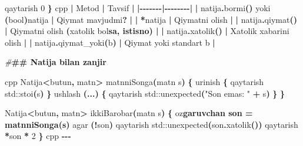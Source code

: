 \documentclass[a4paper,11pt,twoside,openright]{book}
\newenvironment{Shaded}{\begin{snugshade}}{\end{snugshade}}
\newcommand{\BuiltInTok}[1]{#1}
\newcommand{\CharTok}[1]{\textcolor[rgb]{0.31,0.60,0.02}{#1}}
\newcommand{\DataTypeTok}[1]{\textcolor[rgb]{0.13,0.29,0.53}{#1}}
\newcommand{\DecValTok}[1]{\textcolor[rgb]{0.00,0.00,0.81}{#1}}
\newcommand{\ErrorTok}[1]{\textcolor[rgb]{0.64,0.00,0.00}{\textbf{#1}}}
\newcommand{\NormalTok}[1]{#1}
\newcommand{\OperatorTok}[1]{\textcolor[rgb]{0.81,0.36,0.00}{\textbf{#1}}}
\newcommand{\PreprocessorTok}[1]{\textcolor[rgb]{0.56,0.35,0.01}{\textit{#1}}}
\newcommand{\StringTok}[1]{\textcolor[rgb]{0.31,0.60,0.02}{#1}}
\begin{document}
\begin{Shaded}
\begin{Highlighting}[]
\NormalTok{    qaytarish }\DecValTok{0}
\OperatorTok{\}}
\ErrorTok{\textasciigrave{}\textasciigrave{}\textasciigrave{}}\NormalTok{cpp}
\OperatorTok{|}\NormalTok{ Metod }\OperatorTok{|}\NormalTok{ Tavsif }\OperatorTok{|}
\OperatorTok{|{-}{-}{-}{-}{-}{-}{-}|{-}{-}{-}{-}{-}{-}{-}{-}|}
\OperatorTok{|} \ErrorTok{\textasciigrave{}}\NormalTok{natija}\OperatorTok{.}\NormalTok{bormi}\OperatorTok{()}\ErrorTok{\textasciigrave{}}\NormalTok{ yoki }\ErrorTok{\textasciigrave{}}\OperatorTok{(}\DataTypeTok{bool}\OperatorTok{)}\NormalTok{natija}\ErrorTok{\textasciigrave{}} \OperatorTok{|}\NormalTok{ Qiymat mavjudmi}\OperatorTok{?} \OperatorTok{|}
\OperatorTok{|} \ErrorTok{\textasciigrave{}}\OperatorTok{*}\NormalTok{natija}\ErrorTok{\textasciigrave{}} \OperatorTok{|}\NormalTok{ Qiymatni olish }\OperatorTok{|}
\OperatorTok{|} \ErrorTok{\textasciigrave{}}\NormalTok{natija}\OperatorTok{.}\NormalTok{qiymat}\OperatorTok{()}\ErrorTok{\textasciigrave{}} \OperatorTok{|}\NormalTok{ Qiymatni olish }\OperatorTok{(}\NormalTok{xatolik bo}\CharTok{\textquotesingle{}l}\ErrorTok{sa, istisno) |}
\OperatorTok{|} \ErrorTok{\textasciigrave{}}\NormalTok{natija}\OperatorTok{.}\NormalTok{xatolik}\OperatorTok{()}\ErrorTok{\textasciigrave{}} \OperatorTok{|}\NormalTok{ Xatolik xabarini olish }\OperatorTok{|}
\OperatorTok{|} \ErrorTok{\textasciigrave{}}\NormalTok{natija}\OperatorTok{.}\NormalTok{qiymat\_yoki}\OperatorTok{(}\NormalTok{b}\OperatorTok{)}\ErrorTok{\textasciigrave{}} \OperatorTok{|}\NormalTok{ Qiymat yoki standart }\ErrorTok{\textasciigrave{}}\NormalTok{b}\ErrorTok{\textasciigrave{}} \OperatorTok{|}

\PreprocessorTok{\#}\ErrorTok{\#\# \textasciigrave{}Natija\textasciigrave{} bilan zanjir}

\ErrorTok{\textasciigrave{}\textasciigrave{}\textasciigrave{}}\NormalTok{cpp}
\NormalTok{Natija}\OperatorTok{\textless{}}\NormalTok{butun}\OperatorTok{,}\NormalTok{ matn}\OperatorTok{\textgreater{}}\NormalTok{ matnniSonga}\OperatorTok{(}\NormalTok{matn s}\OperatorTok{)} \OperatorTok{\{}
\NormalTok{    urinish }\OperatorTok{\{}
\NormalTok{        qaytarish }\BuiltInTok{std::}\NormalTok{stoi}\OperatorTok{(}\NormalTok{s}\OperatorTok{)}
    \OperatorTok{\}}\NormalTok{ ushlash }\OperatorTok{(...)} \OperatorTok{\{}
\NormalTok{        qaytarish }\BuiltInTok{std::}\NormalTok{unexpected}\OperatorTok{(}\StringTok{"Son emas: "} \OperatorTok{+}\NormalTok{ s}\OperatorTok{)}
    \OperatorTok{\}}
\OperatorTok{\}}

\NormalTok{Natija}\OperatorTok{\textless{}}\NormalTok{butun}\OperatorTok{,}\NormalTok{ matn}\OperatorTok{\textgreater{}}\NormalTok{ ikkiBarobar}\OperatorTok{(}\NormalTok{matn s}\OperatorTok{)} \OperatorTok{\{}
\NormalTok{    o}\CharTok{\textquotesingle{}z}\ErrorTok{garuvchan son = matnniSonga(s)}
\NormalTok{    agar }\OperatorTok{(!}\NormalTok{son}\OperatorTok{)}\NormalTok{ qaytarish }\BuiltInTok{std::}\NormalTok{unexpected}\OperatorTok{(}\NormalTok{son}\OperatorTok{.}\NormalTok{xatolik}\OperatorTok{())}
\NormalTok{    qaytarish }\OperatorTok{*}\NormalTok{son }\OperatorTok{*} \DecValTok{2}
\OperatorTok{\}}
\ErrorTok{\textasciigrave{}\textasciigrave{}\textasciigrave{}}\NormalTok{cpp}
\OperatorTok{{-}{-}{-}}


\end{Highlighting}
\end{Shaded}
\end{document}
